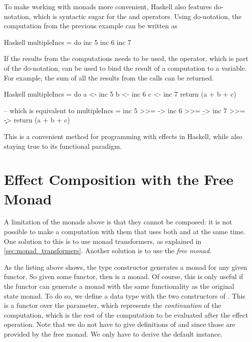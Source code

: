 To make working with monads more convenient, Haskell also features do-notation, which is syntactic sugar for the \hs{>>=} and \hs{>>} operators. Using do-notation, the  computation from the previous example can be written as

\begin{lst}{Haskell}
multipleIncs = do
  inc 5
  inc 6
  inc 7
\end{lst}

If the results from the  computations needs to be used, the \hs{<-} operator, which is part of the do-notation, can be used to bind the result of a computation to a variable. For example, the sum of all the results from the  calls can be returned.

\begin{lst}{Haskell}
multipleIncs = do
  a <- inc 5
  b <- inc 6
  c <- inc 7
  return (a + b + c)

-- which is equivalent to
multipleIncs = 
  inc 5 >>= \a ->
    inc 6 >>= \b ->
      inc 7 >>= \c ->
        return (a + b + c)
\end{lst}

This is a convenient method for programming with effects in Haskell, while also staying true to its functional paradigm.

\section{Effect Composition with the Free Monad}


A limitation of the monads above is that they cannot be composed: it is not possible to make a computation with them that uses both  and  at the same time. One solution to this is to use monad transformers, as explained in \cref{sec:monad_transformers}. Another solution is to use the \emph{free monad}.


As the listing above shows, the  type constructor generates a monad for any given functor. So given some  functor, then  is a monad. Of course, this is only useful if the  functor can generate a monad with the same functionality as the original state monad. To do so, we define a data type with the two constructors of . This is a functor over the  parameter, which represents the \emph{continuation} of the computation, which is the rest of the computation to be evaluated after the effect operation. Note that we do not have to give definitions of  and \hs{>>=} since those are provided by the free monad. We only have to derive the default  instance.

